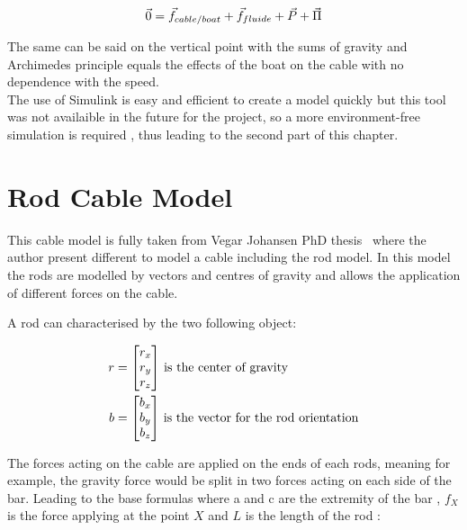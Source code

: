 \begin{equation}
 \vec{0} = \vec{f}_{cable/boat}+\vec{f}_{fluide}+\vec{P}+\vec{\Pi}\\
 \label{equ_Stab}
\end{equation}

The same can be said on the vertical point with the sums of gravity and Archimedes principle equals the effects of the boat on the cable with no dependence with the speed.\\

The use of Simulink is easy and efficient to create a model quickly but this tool was not availaible in the future for the project, so a more environment-free simulation is required , thus leading to the second part of
this chapter. 


\section{Rod Cable Model}

This cable model is fully taken from  Vegar Johansen PhD thesis~\cite{johansen2007modelling} where the author present different to model a cable including the rod model. In this model the rods are modelled by vectors and centres of gravity and allows the application of different forces on the cable.

A rod can characterised by the two following object:

\begin{align}
r &= \begin{bmatrix}
    r_x \\
    r_y \\
    r_z
\end{bmatrix}\, \textnormal{is the center of gravity}\\
b &= \begin{bmatrix}
    b_x \\
    b_y \\
    b_z
\end{bmatrix}\, \textnormal{is the vector for the rod orientation}
\end{align}

The forces acting on the cable are applied on the ends of each rods, meaning for example, the gravity force would be split in two forces acting on each side of the bar. Leading to the base formulas where a and c are the extremity of the bar ,  $f_X$ is the force applying at the point $X$ and $L$ is the length of the rod :

